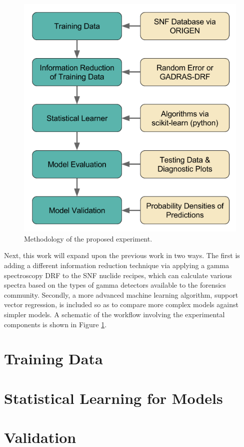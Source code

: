\begin{figure}[H]
  \centering
  \includegraphics[width=0.9\linewidth]{./chapters/demo_method/methodology.png}
  \caption{Methodology of the proposed experiment.}
  \label{fig:method}
\end{figure}

Next, this work will expand upon the previous work in two ways.  The first is
adding a different information reduction technique via applying a gamma
spectroscopy \gls{DRF} to the \gls{SNF} nuclide recipes, which can calculate
various spectra based on the types of gamma detectors available to the
forensics community.  Secondly, a more advanced machine learning algorithm,
support vector regression, is included so as to compare more complex models
against simpler models.  A schematic of the workflow involving the experimental
components is shown in Figure \ref{fig:method}.

\section{Training Data}
\label{sec:training}


\section{Statistical Learning for Models}
\label{sec:statmodel}


\section{Validation}
\label{sec:valid}


